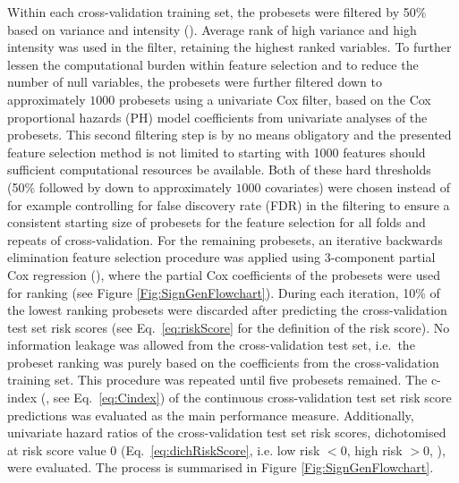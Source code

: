 \documentclass[letterpaper,12pt]{article}
\begin{document}
Within each cross-validation training set, the probesets were filtered by 50\% based on variance and intensity (\citet{Hackstadt:09}). Average rank of high variance and high intensity was used in the filter, retaining the highest ranked variables. To further lessen the computational burden within feature selection and to reduce the number of null variables, the probesets were further filtered down to approximately $1000$ probesets using a univariate Cox filter, based on the Cox proportional hazards (PH) model coefficients from univariate analyses of the probesets. This second filtering step is by no means obligatory and the presented feature selection method is not limited to starting with 1000 features should sufficient computational resources be available. Both of these hard thresholds (50\% followed by down to approximately $1000$ covariates) were chosen instead of for example controlling for false discovery rate (FDR) in the filtering to ensure a consistent starting size of probesets for the feature selection for all folds and repeats of cross-validation. For the remaining probesets, an iterative backwards elimination feature selection procedure was applied using 3-component partial Cox regression (\citet{Li:04}), where the partial Cox coefficients of the probesets were used for ranking (see Figure \ref{Fig:SignGenFlowchart}). During each iteration, 10\% of the lowest ranking probesets were discarded after predicting the cross-validation test set risk scores (see Eq.\ \ref{eq:riskScore} for the definition of the risk score). No information leakage was allowed from the cross-validation test set, i.e.\ the probeset ranking was purely based on the coefficients from the cross-validation training set. This procedure was repeated until five probesets remained. The c-index (\citet{Harrell:10}, see Eq.\ \ref{eq:Cindex}) of the continuous cross-validation test set risk score predictions was evaluated as the main performance measure. Additionally, univariate hazard ratios of the cross-validation test set risk scores, dichotomised at risk score value $0$ (Eq.\ \ref{eq:dichRiskScore}, i.e. low risk $<0$, high risk $>0$, \citet{Li:04}), were evaluated. The process is summarised in Figure \ref{Fig:SignGenFlowchart}.
\end{document}
